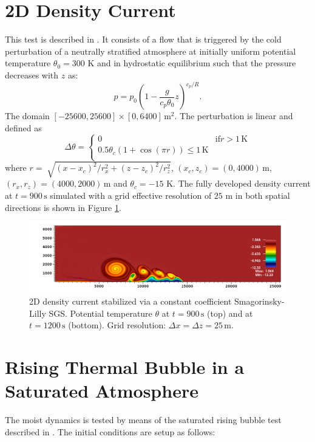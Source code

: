 \documentclass{report}
\begin{document}
\section{2D Density Current}
This test is described in \cite{strakaWilhelmson1993}. It consists of a flow that is triggered by the cold perturbation of a neutrally stratified atmosphere at initially uniform potential temperature $\theta_0 = 300$ K
and in hydrostatic equilibrium such that the pressure decreases with $z$ as:
\begin{equation}
\label{pressureDistrib2}
p = p_{0}\left(1-\frac{g}{c_p{\theta_{0}}}z\right)^{c_p/R}.
\end{equation}
The domain $[-25600,25600]\times[0,6400]\,\mathrm{m}^2$.
The perturbation is linear and defined as
\begin{equation}
 \Delta\theta = \left\{ \begin{array}{ll}
 0 & \mathrm{if } r > 1\,{\mathrm K}\\
 0.5 \theta_c \left(1 + \cos(\pi r) \right) \leq 1\,{\mathrm K}\\
\end{array} \right.
\label{eq:robertIni2}
\end{equation}
where $r = \sqrt[]{(x-x_{c})^2/r_x^{2} + (z-z_{c})^{2}/r_z^2}$, $(x_c,z_c) = (0,4000)\,\mathrm{m}$, $(r_x, r_z) = (4000, 2000)\,\mathrm{m}$ and $\theta_c=-15$ K. The fully developed density current at $t=900\,\mathrm{s}$ simulated with a grid effective resolution of $25$ m in both spatial directions is shown in Figure \ref{fig:benchmarks/dc25msmago}.

\begin{figure}[htbp]
\includegraphics[width=1.2\textwidth]{figures/DC-smgo-25mx25m-900s0000.png}
\caption{2D density current stabilized via a constant coefficient Smagorinsky-Lilly SGS. Potential temperature $\theta$ at $t=900\,\mathrm{s}$ (top) and at $t=1200\,\mathrm{s}$ (bottom). Grid resolution: $\Delta x = \Delta z = 25\,\mathrm{m}$.
}
\label{fig:benchmarks/dc25msmago}
\end{figure}


\section{Rising Thermal Bubble in a Saturated Atmosphere}
\label{rtb3D}
The moist dynamics is tested by means of the saturated rising bubble test described in \cite{Pressel15a}. The initial conditions are setup as follows:
\end{document}
